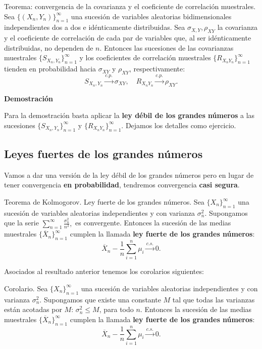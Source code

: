 \documentclass[]{book}
\begin{document}
Teorema: convergencia de la covarianza y el coeficiente de correlación muestrales.
Sea \(\{(X_n,Y_n)\}_{n=1}^\infty\) una sucesión de variables aleatorias bidimensionales independientes dos a dos e idénticamente distribuidas.
Sea \(\sigma_{X,Y}, \rho_{XY}\) la covarianza y el coeficiente de correlación de cada par de variables que, al ser idénticamente distribuidas, no dependen de \(n\). Entonces las sucesiones de las covarianzas muestrales \(\{S_{X_n,Y_n}\}_{n=1}^\infty\) y los coeficientes de correlación muestrales \(\{R_{X_nY_n}\}_{n=1}^\infty\) tienden en probabilidad hacia \(\sigma_{XY}\) y \(\rho_{XY}\), respectivamente:
\[
S_{X_n,Y_n}\stackrel{c.p.}{\longrightarrow}\sigma_{XY},\quad R_{X_nY_n}\stackrel{c.p.}{\longrightarrow}\rho_{XY}.
\]

\textbf{Demostración}

Para la demostración basta aplicar la \textbf{ley débil de los grandes números} a las sucesiones \(\{S_{X_n,Y_n}\}_{n=1}^\infty\) y \(\{R_{X_nY_n}\}_{n=1}^\infty\). Dejamos los detalles como ejercicio.

\hypertarget{leyes-fuertes-de-los-grandes-nuxfameros}{%
\subsection{Leyes fuertes de los grandes números}\label{leyes-fuertes-de-los-grandes-nuxfameros}}

Vamos a dar una versión de la ley débil de los grandes números pero en lugar de tener convergencia \textbf{en probabilidad}, tendremos convergencia \textbf{casi segura}.

Teorema de Kolmogorov. Ley fuerte de los grandes números.
Sea \(\{X_n\}_{n=1}^\infty\) una sucesión de variables aleatorias independientes y con varianza \(\sigma_n^2\). Supongamos que la serie
\(\sum\limits_{n=1}^\infty \frac{\sigma_n^2}{n^2},\)
es convergente. Entonces la sucesión de las medias muestrales \(\{\overline{X}_n\}_{n=1}^\infty\) cumplen la
llamada \textbf{ley fuerte de los grandes números}:
\[
\overline{X}_n-\frac{1}{n}\sum_{i=1}^n \mu_i \stackrel{c.s.}{\longrightarrow} 0.
\]

Asociados al resultado anterior tenemos los corolarios siguientes:

Corolario.
Sea \(\{X_n\}_{n=1}^\infty\) una sucesión de variables aleatorias independientes y con varianza \(\sigma_n^2\). Supongamos que existe una constante \(M\) tal que todas las varianzas están acotadas por \(M\): \(\sigma_n^2\leq M\), para todo \(n\).
Entonces la sucesión de las medias muestrales \(\{\overline{X}_n\}_{n=1}^\infty\) cumplen la
llamada \textbf{ley fuerte de los grandes números}:
\[
\overline{X}_n-\frac{1}{n}\sum_{i=1}^n \mu_i \stackrel{c.s.}{\longrightarrow} 0.
\]
\end{document}
